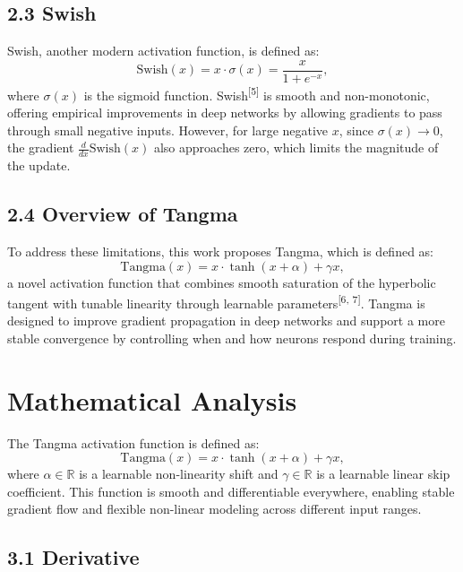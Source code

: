 \documentclass{article}
\begin{document}
\vspace{7pt}



\subsection*{2.3 Swish}
Swish, another modern activation function, is defined as:
\[
\text{Swish}(x) = x \cdot \sigma(x) = \frac{x}{1 + e^{-x}},
\]
where \( \sigma(x) \) is the sigmoid function. Swish\textsuperscript{[5]} is smooth and non-monotonic, offering empirical improvements in deep networks by allowing gradients to pass through small negative inputs.  However, for large negative \( x \), since \( \sigma(x) \to 0 \), the gradient \( \frac{d}{dx} \text{Swish}(x) \) also approaches zero, which limits the magnitude of the update. 



\vspace{7pt}




\subsection*{2.4 Overview of Tangma}

To address these limitations, this work proposes Tangma, which is defined as: \[\text{Tangma}(x) = x \cdot \tanh(x + \alpha) + \gamma x,\] a novel activation function that combines smooth saturation of the hyperbolic tangent with tunable linearity through learnable parameters\textsuperscript{[6, 7]}. Tangma is designed to improve gradient propagation in deep networks and support a more stable convergence by controlling when and how neurons respond during training.


\section{Mathematical Analysis }

The Tangma activation function is defined as:
\[
\text{Tangma}(x) = x \cdot \tanh(x + \alpha) + \gamma x,
\]
where \( \alpha \in \mathbb{R} \) is a learnable non-linearity shift and \( \gamma \in \mathbb{R} \) is a learnable linear skip coefficient. This function is smooth and differentiable everywhere, enabling stable gradient flow and flexible non-linear modeling across different input ranges.

\subsection*{3.1 Derivative}
\end{document}
